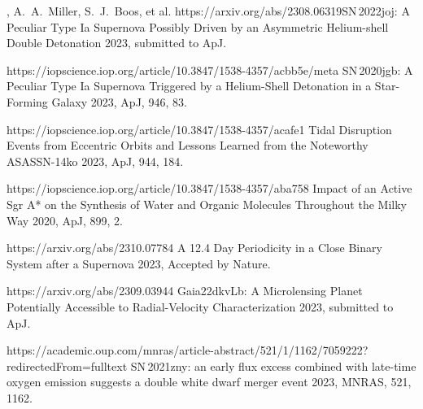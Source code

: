 


\begin{cvpubs}


\cvpub
{ %
\begin{cvitems}
    \item \cvsubpub
    {\Cliu, A.~A.~Miller, S.~J.~Boos, et al.}
    {}
    {https://arxiv.org/abs/2308.06319}{SN\,2022joj: A Peculiar Type Ia Supernova Possibly Driven by an Asymmetric Helium-shell Double Detonation}
    {2023, submitted to ApJ.}
    \item {}
    {}
    {https://iopscience.iop.org/article/10.3847/1538-4357/acbb5e/meta}
    {SN\,2020jgb: A Peculiar Type Ia Supernova Triggered by a Helium-Shell Detonation in a Star-Forming Galaxy}
    {2023, ApJ, 946, 83.}
    \item {}
    {}
    {https://iopscience.iop.org/article/10.3847/1538-4357/acafe1}
    {Tidal Disruption Events from Eccentric Orbits and Lessons Learned from the Noteworthy ASASSN-14ko}
    {2023, ApJ, 944, 184.}
    \item {}
    {}
    {https://iopscience.iop.org/article/10.3847/1538-4357/aba758}
    {Impact of an Active Sgr A* on the Synthesis of Water and Organic Molecules Throughout the Milky Way}
    {2020, ApJ, 899, 2.}
    \item {} 
    {\Cliu}
    {https://arxiv.org/abs/2310.07784}
    {A 12.4 Day Periodicity in a Close Binary System after a Supernova}
    {2023, Accepted by Nature.}
    \item {} 
    {\Cliu}
    {https://arxiv.org/abs/2309.03944}
    {Gaia22dkvLb: A Microlensing Planet Potentially Accessible to Radial-Velocity Characterization}
    {2023, submitted to ApJ.}
    \item {} 
    {\Cliu}
    {https://academic.oup.com/mnras/article-abstract/521/1/1162/7059222?redirectedFrom=fulltext}
    {SN\,2021zny: an early flux excess combined with late-time oxygen emission suggests a double white dwarf merger event}
    {2023, MNRAS, 521, 1162.}
\end{cvitems}
}


\end{cvpubs}